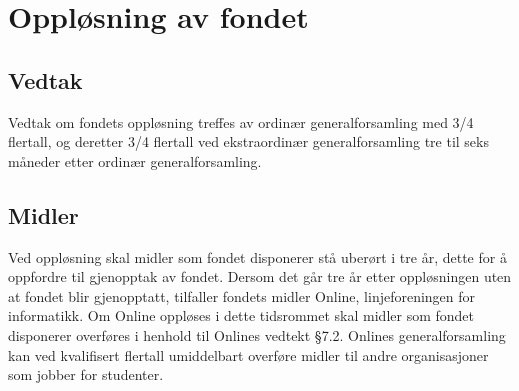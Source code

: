 \chapter{Oppløsning av fondet}

\section{Vedtak}

Vedtak om fondets oppløsning treffes av ordinær generalforsamling med 3/4 flertall, og deretter 3/4 flertall ved ekstraordinær generalforsamling tre til seks måneder etter ordinær generalforsamling.

\section{Midler}

Ved oppløsning skal midler som fondet disponerer stå uberørt i tre år, dette for å oppfordre til gjenopptak av fondet. Dersom det går tre år etter oppløsningen uten at fondet blir gjenopptatt, tilfaller fondets midler Online, linjeforeningen for informatikk. Om Online oppløses i dette tidsrommet skal midler som fondet disponerer overføres i henhold til Onlines vedtekt §7.2. Onlines generalforsamling kan ved kvalifisert flertall umiddelbart overføre midler til andre organisasjoner som jobber for studenter.
